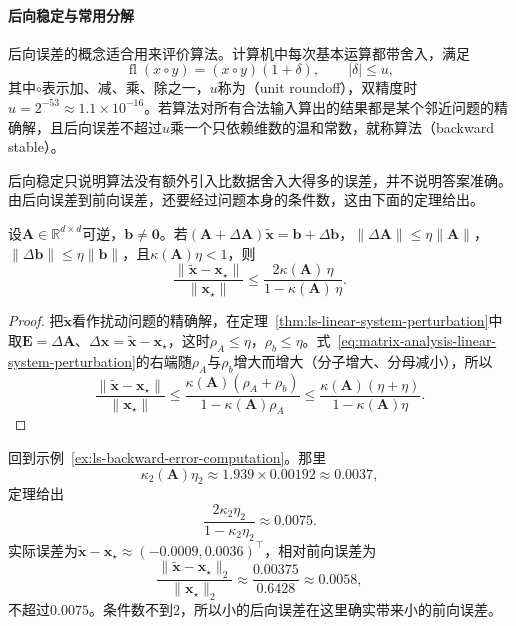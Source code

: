 \paragraph{后向稳定与常用分解}
后向误差的概念适合用来评价算法。计算机中每次基本运算都带舍入，满足
\begin{equation}
 \operatorname{fl}(x\circ y)=(x\circ y)(1+\delta),\qquad |\delta|\leq u,
 \label{eq:ls-rounding-model}
\end{equation}
其中$\circ$表示加、减、乘、除之一，$u$称为（unit roundoff），双精度时$u=2^{-53}\approx1.1\times10^{-16}$。若算法对所有合法输入算出的结果都是某个邻近问题的精确解，且后向误差不超过$u$乘一个只依赖维数的温和常数，就称算法（backward stable）。

后向稳定只说明算法没有额外引入比数据舍入大得多的误差，并不说明答案准确。由后向误差到前向误差，还要经过问题本身的条件数，这由下面的定理给出。

\begin{theorem}[由后向误差估计前向误差]
\label{thm:ls-forward-backward-error}
设$\bm A\in\mathbb R^{d\times d}$可逆，$\bm b\ne\bm0$。若$(\bm A+\Delta\bm A)\tilde{\bm x}=\bm b+\Delta\bm b$，$\lVert\Delta\bm A\rVert\leq\eta\lVert\bm A\rVert$，$\lVert\Delta\bm b\rVert\leq\eta\lVert\bm b\rVert$，且$\kappa(\bm A)\eta<1$，则
\begin{equation}
 \frac{\lVert\tilde{\bm x}-\bm x_\star\rVert}{\lVert\bm x_\star\rVert}\leq\frac{2\kappa(\bm A)\,\eta}{1-\kappa(\bm A)\,\eta}.
 \label{eq:ls-forward-backward-error-bound}
\end{equation}
\end{theorem}
\begin{proof}
把$\tilde{\bm x}$看作扰动问题的精确解，在定理~\ref{thm:ls-linear-system-perturbation}中取$\bm E=\Delta\bm A$、$\Delta\bm x=\tilde{\bm x}-\bm x_\star$，这时$\rho_A\leq\eta$，$\rho_b\leq\eta$。式~\eqref{eq:matrix-analysis-linear-system-perturbation}的右端随$\rho_A$与$\rho_b$增大而增大（分子增大、分母减小），所以
\[
 \frac{\lVert\tilde{\bm x}-\bm x_\star\rVert}{\lVert\bm x_\star\rVert}
 \leq\frac{\kappa(\bm A)(\rho_A+\rho_b)}{1-\kappa(\bm A)\rho_A}
 \leq\frac{\kappa(\bm A)(\eta+\eta)}{1-\kappa(\bm A)\eta}.
\]
\end{proof}

回到示例~\ref{ex:ls-backward-error-computation}。那里
\[
 \kappa_2(\bm A)\eta_2\approx1.939\times0.00192\approx0.0037,
\]
定理给出
\[
 \frac{2\kappa_2\eta_2}{1-\kappa_2\eta_2}\approx0.0075 .
\]
实际误差为$\tilde{\bm x}-\bm x_\star\approx(-0.0009,0.0036)^\top$，相对前向误差为
\[
 \frac{\lVert\tilde{\bm x}-\bm x_\star\rVert_2}{\lVert\bm x_\star\rVert_2}\approx\frac{0.00375}{0.6428}\approx0.0058,
\]
不超过$0.0075$。条件数不到$2$，所以小的后向误差在这里确实带来小的前向误差。

